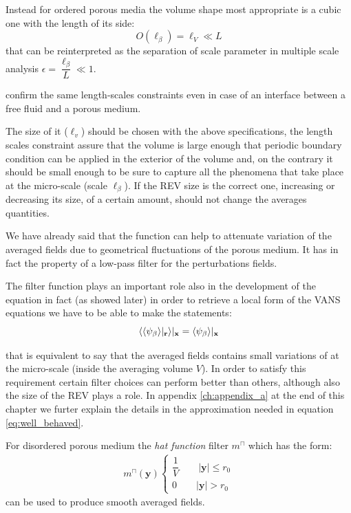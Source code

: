 Instead for ordered porous media the volume shape most appropriate is a cubic one with the length of its side:
$$
O(\ell_{\beta}) = \ell_V \ll L
$$
that can be reinterpreted as the separation of scale parameter in multiple scale analysis $\epsilon = \dfrac{\ell_{\beta}}{L} \ll 1$.

\citet{ochoa1995momentum} confirm the same length-scales constraints even in case of an interface between a free fluid and a porous medium.


The size of it ($\ell_v$) should be chosen with the above specifications, the length scales constraint assure that the volume is large enough that periodic boundary condition can be applied in the exterior of the volume and, on the contrary it should be small enough to be sure to capture all the phenomena that take place at the micro-scale (scale $\ell_{\beta}$).
If the REV size is the correct one, increasing or decreasing its size, of a certain amount, should not change the averages quantities.

We have already said that the function can help to attenuate variation of the averaged fields due to geometrical fluctuations of the porous medium.
It has in fact the property of a low-pass filter for the perturbations fields.


The filter function plays an important role also in the development of the equation in fact (as showed later) in order to retrieve a local form of the VANS equations we have to be able to make the statements:
\begin{equation}
{\left< {\left< \psi_{\beta} \right>}|_{\mathbf{r}} \right>}|_{\mathbf{x}} = {\left< \psi_{\beta} \right>}|_{\mathbf{x}}
\label{eq:well_behaved}
\end{equation}

that is equivalent to say that the averaged fields contains small variations of at the micro-scale (inside the averaging volume $V$).
In order to satisfy this requirement certain filter choices can perform better than others, although also the size of the REV plays a role.
In appendix \ref{ch:appendix_a} at the end of this chapter we furter explain the details in the approximation needed in equation \ref{eq:well_behaved}.

For disordered porous medium the \textit{hat function} filter $m^{\sqcap}$ which has the form:
\begin{eqnarray}
	m^{\sqcap}(\mathbf{y}) 
	\begin{cases}
		\dfrac{1}{V} \qquad |\mathbf{y}| \leqslant r_0\\
		0 \qquad |\mathbf{y}|> r_0
	\end{cases}
\end{eqnarray}
can be used to produce smooth averaged fields.

